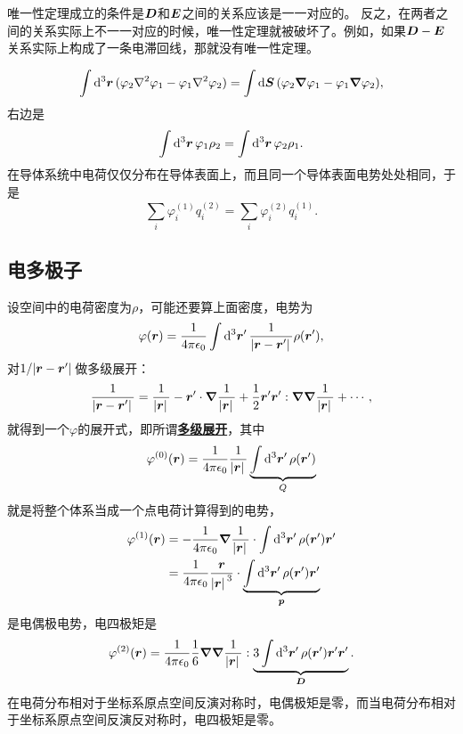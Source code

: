 \documentclass[UTF8, a4paper]{ctexart}
\newcommand*{\concept}[1]{\underline{\textbf{#1}}}
\begin{document}
唯一性定理成立的条件是$\vb*{D}$和$\vb*{E}$之间的关系应该是一一对应的。
反之，在两者之间的关系实际上不一一对应的时候，唯一性定理就被破坏了。例如，如果$\vb*{D}-\vb*{E}$关系实际上构成了一条电滞回线，那就没有唯一性定理。


\[
    \int \dd[3]{\vb*{r}} (\varphi_2 \laplacian{\varphi_1} - \varphi_1 \laplacian{\varphi_2}) = \int \dd{\vb*{S}} (\varphi_2 \grad{\varphi_1} - \varphi_1 \grad{\varphi_2}),
\]
右边是
\begin{equation}
    \int \dd[3]{\vb*{r}} \varphi_1 \rho_2 = \int \dd[3]{\vb*{r}} \varphi_2 \rho_1.
\end{equation}
在导体系统中电荷仅仅分布在导体表面上，而且同一个导体表面电势处处相同，于是
\begin{equation}
    \sum_i \varphi_i^{(1)} q_i^{(2)} = \sum_i \varphi_i^{(2)} q_i^{(1)}.
\end{equation}

\subsection{电多极子}

设空间中的电荷密度为$\rho$，可能还要算上面密度，电势为
\[
    \varphi(\vb*{r}) = \frac{1}{4\pi \epsilon_0} \int \dd[3]{\vb*{r}'} \frac{1}{\abs*{\vb*{r} - \vb*{r}'}} \rho(\vb*{r}'),
\]
对$1/\abs*{\vb*{r}-\vb*{r}'}$做多级展开：
\[
    \frac{1}{\abs*{\vb*{r}-\vb*{r}'}} = \frac{1}{\abs*{\vb*{r}}} - \vb*{r}' \cdot \grad{\frac{1}{\abs*{\vb*{r}}}} + \frac{1}{2} \vb*{r}' \vb*{r}' : \grad{\grad{\frac{1}{\abs*{\vb*{r}}}}} + \cdots,
\]
就得到一个$\varphi$的展开式，即所谓\concept{多级展开}，其中
\begin{equation}
    \varphi^{(0)}(\vb*{r}) = \frac{1}{4\pi \epsilon_0} \frac{1}{\abs*{\vb*{r}}} \underbrace{\int \dd[3]{\vb*{r}'} \rho(\vb*{r}')}_{Q}
\end{equation}
就是将整个体系当成一个点电荷计算得到的电势，
\begin{equation}
    \begin{aligned}
        \varphi^{(1)}(\vb*{r}) &= - \frac{1}{4\pi \epsilon_0} \grad{\frac{1}{\abs*{\vb*{r}}}} \cdot \int \dd[3]{\vb*{r}'} \rho(\vb*{r}') \vb*{r}' \\
        &= \frac{1}{4\pi \epsilon_0} \frac{\vb*{r}}{\abs*{\vb*{r}}^3} \cdot \underbrace{\int \dd[3]{\vb*{r}'} \rho(\vb*{r}') \vb*{r}'}_{\vb*{p}}
    \end{aligned}
\end{equation}
是电偶极电势，电四极矩是
\begin{equation}
    \varphi^{(2)}(\vb*{r}) = \frac{1}{4 \pi \epsilon_0} \frac{1}{6} \grad{\grad{\frac{1}{\abs*{\vb*{r}}}}} : \underbrace{3 \int \dd[3]{\vb*{r}'} \rho(\vb*{r}') \vb*{r}' \vb*{r}' }_{\vb*{D}}.
\end{equation}
在电荷分布相对于坐标系原点空间反演对称时，电偶极矩是零，而当电荷分布相对于坐标系原点空间反演反对称时，电四极矩是零。
\end{document}

